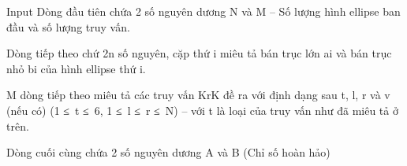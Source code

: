 Input
Dòng đầu tiên chứa 2 số nguyên dương N và M – Số lượng hình ellipse ban đầu và số lượng truy vấn.  

   Dòng tiếp theo chứ 2n số nguyên, cặp thứ i miêu tả bán trục lớn ai và bán trục nhỏ bi của hình ellipse thứ i.  

   M dòng tiếp theo miêu tả các truy vấn KrK đề ra với định dạng sau t, l, r và v (nếu có) (1 ≤ t ≤ 6, 1 ≤ l ≤ r ≤ N) – với t là loại của truy vấn như đã miêu tả ở trên.  

   Dòng cuối cùng chứa 2 số nguyên dương A và B (Chỉ số hoàn hảo)